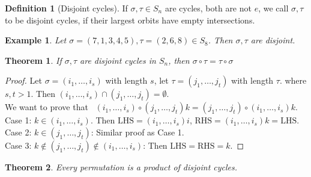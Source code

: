 \documentclass{article}
\theoremstyle{MyNonumberplain}
\theoremstyle{break}
\newtheorem*{proof}{Proof. }
\newcommand{\nin}{\not\in}
\newcommand{\tmop}{\text}
\theoremstyle{break}
\newtheorem{theorem}{Theorem}[section]
\newtheorem{example}{Example}[section]
\theoremstyle{break}
\theoremstyle{definition}
\theoremstyle{break}
\newtheorem{definition}{Definition}[section]
\begin{document}
\begin{defbox}
    \begin{definition}[Disjoint cycles]
        If $\sigma, \tau \in S_n$ are cycles, both are not $e$, we call $\sigma, \tau$ to be disjoint cycles, if their largest orbits have empty intersections.
    \end{definition}
\end{defbox}

\begin{expbox}
    \begin{example}
        Let $\sigma = (7, 1, 3, 4, 5), \tau = (2, 6, 8) \in S_8$. Then $\sigma, \tau$ are disjoint.
    \end{example}
\end{expbox}

\begin{thmbox}
    \begin{theorem}
        If $\sigma, \tau$ are disjoint cycles in $S_n$, then $\sigma \circ \tau = \tau \circ \sigma$
    \end{theorem}
    \begin{prfbox}
        \begin{proof}
            Let $\sigma = (i_1, \ldots, i_s)$ with length $s$, let $\tau = (j_1, \ldots,
            j_t)$ with length $\tau$. where $s, t > 1$. Then $(i_1, \ldots, i_s) \cap (j_1, \ldots, j_t) = \emptyset$. \\
            
            We want to prove that \ $(i_1, \ldots, i_s) \circ (j_1, \ldots, j_t) k = (j_1, \ldots, j_t) \circ (i_1, \ldots, i_s) k$.\\

            Case 1: $k \in (i_1, \ldots, i_s)$. Then $\tmop{LHS} = (i_1, \ldots, i_s) i$,
            $\tmop{RHS} = (i_1, \ldots, i_s) k = \tmop{LHS}$.\\

            Case 2: $k \in (j_1, \ldots, j_t)$: Similar proof as Case 1.\\

            Case 3: $k \nin (j_1, \ldots, j_t) \nin (i_1, \ldots, i_s)$: Then $\tmop{LHS}
            = \tmop{RHS} = k$.
        \end{proof}
    \end{prfbox}
\end{thmbox}

\begin{thmbox}
    \begin{theorem}
        Every permutation is a product of disjoint cycles. 
    \end{theorem}
\end{thmbox}
\end{document}
